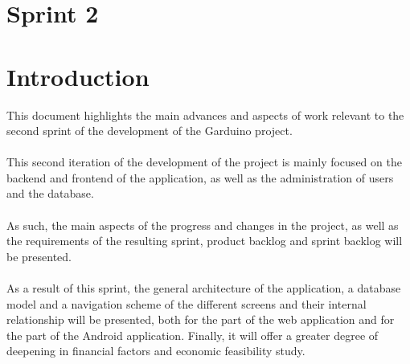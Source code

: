 \documentclass[11pt,a4paper]{article}
\begin{document}
\renewcommand{\headrulewidth}{0.5pt}
\renewcommand{\footrulewidth}{0.5pt}
\fancypagestyle{plain}{
\fancyhead[L]{}
\fancyhead[C]{}
\fancyhead[R]{\thepage}
\fancyfoot[L]{}
\fancyfoot[C]{}
\fancyfoot[R]{}
\renewcommand{\headrulewidth}{0pt}
\renewcommand{\footrulewidth}{0pt}
}
\pagestyle{fancy}
\vspace*{0.05in}

\tableofcontents

\newpage

\vspace*{0.3in}
\listoftables
\listoffigures
\newpage

\part*{Sprint 2}
\part*{Introduction}
This document highlights the main advances and aspects of work relevant to the second sprint of the development of the Garduino project. 
\\ \\
This second iteration of the development of the project is mainly focused on the backend and frontend of the application, as well as the administration of users and the database. 
\\ \\
As such, the main aspects of the progress and changes in the project, as well as the requirements of the resulting sprint, product backlog and sprint backlog will be presented. 
\\ \\
As a result of this sprint, the general architecture of the application, a database model and a navigation scheme of the different screens and their internal relationship will be presented, both for the part of the web application and for the part of the Android application. Finally, it will offer a greater degree of deepening in financial factors and economic feasibility study.
\end{document}
